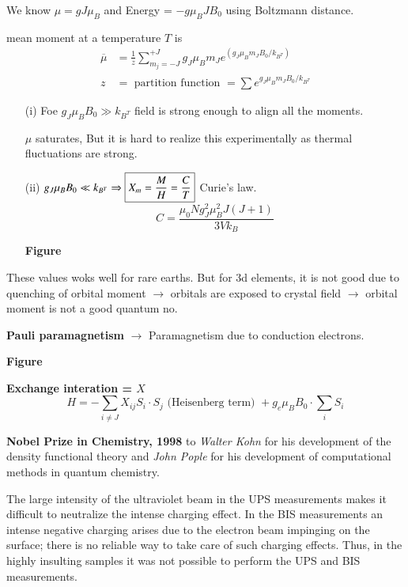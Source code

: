 We know $\mu=gJ\mu_{B}$ and Energy = $-g\mu_{B}JB_{0}$ using Boltzmann distance.

mean moment at a temperature $T$ is
\begin{align*}
\overline{\mu} &= \frac{1}{z}\sum\limits^{+J}_{m_{j}=-J}g_{J}\mu_{B}m_{J}e^{(g_{J}\mu_{B}m_{J}B_{0}/k_{B^{T}})}\\
z &= \text{ partition function } = \sum e^{g_{J}\mu_{B}m_{J}B_{0}/k_{B^{T}}}
\end{align*}
\begin{itemize}
\item[(i)] Foe $g_{J}\mu_{B}B_{0}\gg k_{B^{T}}$ field is strong enough to align all the moments.

$\mu$ saturates, But it is hard to realize this experimentally as thermal fluctuations are strong.

\item[(ii)] $g_{J}\mu_{B}B_{0}\ll k_{B^{T}}\Rightarrow \fbox{$X_{m}=\dfrac{M}{H}=\dfrac{C}{T}$}$ Curie's law.
$$
C=\dfrac{\mu_{0}Ng^{2}_{J}\mu^{2}_{B}J(J+1)}{3Vk_{B}}
$$
\begin{center}
{\bf Figure}
\end{center}
\end{itemize}
These values woks well for rare earths. But for 3d elements, it is not good due to quenching of orbital moment $\to$ orbitals are exposed to crystal field $\to$ orbital moment is not a good quantum no. 

{\bf Pauli paramagnetism} $\to$ Paramagnetism due to conduction electrons.
\begin{center}
{\bf Figure}
\end{center}

\noindent
{\bf Exchange interation = \boldmath$X$}
$$
H=-\sum\limits_{i\neq J}X_{ij}S_{i}\cdot S_{j} \text{ (Heisenberg term) }+g_{e}\mu_{B}B_{0}\cdot \sum\limits_{i}S_{i}
$$


{\bf Nobel Prize in Chemistry, 1998} to {\em Walter Kohn} for his development of the density functional theory and {\em John Pople} for his development of computational methods in quantum chemistry.

The large intensity of the ultraviolet beam in the UPS measurements makes it difficult to neutralize the intense charging effect. In the BIS measurements an intense negative charging arises due to the electron beam impinging on the surface; there is no reliable way to take care of such charging effects. Thus, in the highly insulting samples it was not possible to perform the UPS and BIS measurements.

